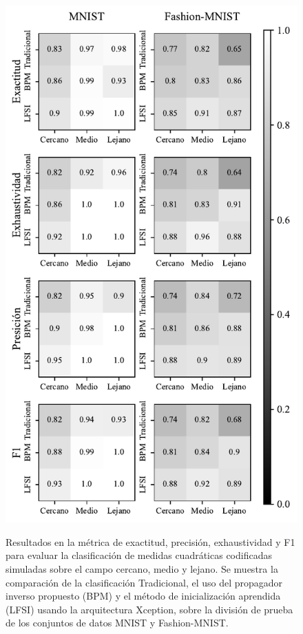 \begin{figure}[!h]
    \centering
    \caption{Resultados en la métrica de exactitud, precisión, exhaustividad y F1 para evaluar la clasificación de medidas cuadráticas codificadas simuladas sobre el campo cercano, medio y lejano. Se muestra la comparación de la clasificación Tradicional, el uso del propagador inverso propuesto (BPM) y el método de inicialización aprendida (LFSI) usando la arquitectura Xception, sobre la división de prueba de los conjuntos de datos MNIST y Fashion-MNIST.}
    \includegraphics[height=0.8\textheight]{images/resultados/test_result_xception.pdf}
    \label{fig:results_xce}
\end{figure}
